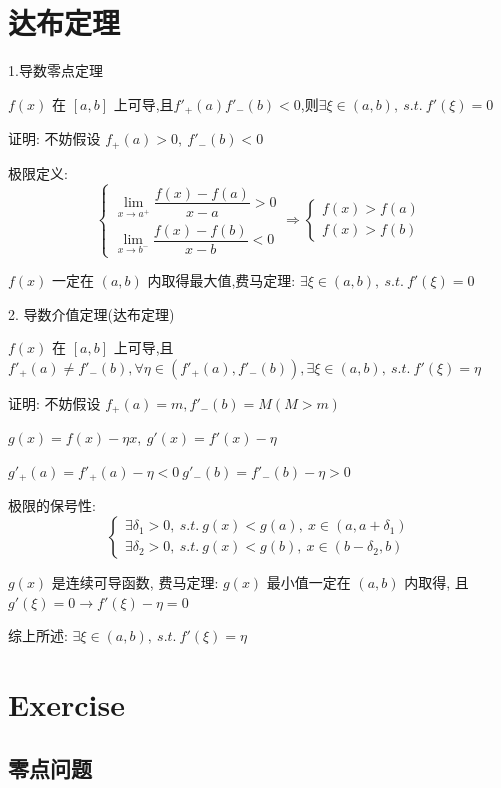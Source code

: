 \section{达布定理}
\begin{theorem}
	1.导数零点定理

	$f(x)$ 在 $[a,b]$ 上可导,且$f'_{+}(a)f'_{-}(b)<0$,则$\exists \xi\in(a,b),\ s.t.\ f'(\xi)=0$

	证明: 不妨假设 $f_{+}(a)>0,\ f'_{-}(b)<0$

	极限定义:
	$$\begin{cases}
		\lim\limits_{x\to a^{+}}\dfrac{f(x)-f(a)}{x-a}>0 \\
		\lim\limits_{x\to b^{-}}\dfrac{f(x)-f(b)}{x-b}<0
	\end{cases}\Rightarrow
	\begin{cases}
		f(x)>f(a) \\
		f(x)>f(b)
	\end{cases}$$

	$f(x)$ 一定在 $(a,b)$ 内取得最大值,费马定理: $\exists \xi\in(a,b),\ s.t.\ f'(\xi)=0$

	2. 导数介值定理(达布定理)

	$f(x)$ 在 $[a,b]$ 上可导,且 $f'_{+}(a)\neq f'_{-}(b),\forall \eta \in (f'_{+}(a),f'_{-}(b)),\exists \xi\in(a,b),\ s.t.\ f'(\xi)=\eta$

	证明: 不妨假设 $f_{+}(a)=m, f'_{-}(b)=M(M>m)$

	$g(x)=f(x)-\eta x,\ g'(x)=f'(x)-\eta$

	$g'_{+}(a)=f'_{+}(a)-\eta<0\ g'_{-}(b)=f'_{-}(b)-\eta>0$

	极限的保号性:
	$$\begin{cases}
		\exists \delta_{1}>0,\ s.t.\ g(x)<g(a),\ x\in(a,a+\delta_{1}) \\
		\exists \delta_{2}>0,\ s.t.\ g(x)<g(b),\ x\in(b-\delta_{2},b)
	\end{cases}$$

	$g(x)$ 是连续可导函数, 费马定理: $g(x)$ 最小值一定在 $(a,b)$ 内取得, 且 $g'(\xi)=0\to f'(\xi) -\eta =0$

	综上所述: $\exists \xi\in(a,b),\ s.t.\ f'(\xi)=\eta$
\end{theorem}
\section{Exercise}

\subsection{零点问题}

